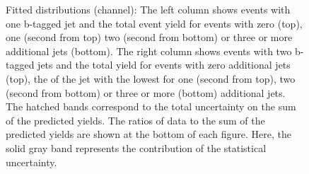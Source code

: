 \begin{figure}[htbp!]
\begin{center}

\caption{Fitted distributions (\mumu channel): 
  The left column shows events with one b-tagged jet and the total event yield for events with zero (top), one (second from top)
  two (second from bottom) or three or more additional jets (bottom).
  The right column shows events with two b-tagged jets and the total yield for events with zero additional jets (top),
 the \pt of the jet with the lowest \pt for one (second from top),
  two (second from bottom) or three or more (bottom) additional jets.
  The hatched bands correspond to the total uncertainty on the sum of
  the predicted yields. The ratios of data to the sum of the
  predicted yields are shown at the bottom of each figure. Here, the solid
  gray band represents the contribution of the statistical uncertainty.  
       \label{fig:lh_mumu_postfitdistr8}}
  \end{center}
\end{figure}

